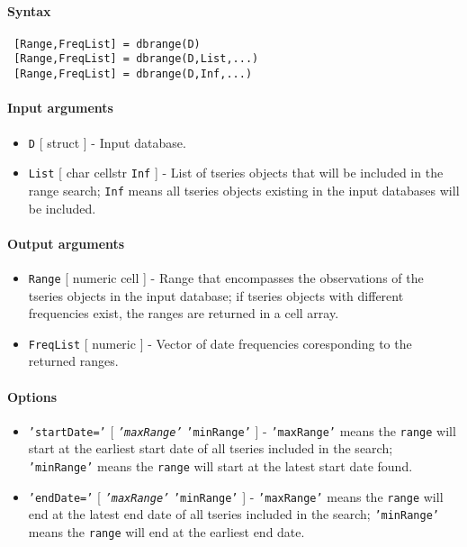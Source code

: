 


	\paragraph{Syntax}
 
 \begin{verbatim}
 [Range,FreqList] = dbrange(D)
 [Range,FreqList] = dbrange(D,List,...)
 [Range,FreqList] = dbrange(D,Inf,...)
 \end{verbatim}
 
 \paragraph{Input arguments}
 
 \begin{itemize}
 \item
   \texttt{D} {[} struct {]} - Input database.
 \item
   \texttt{List} {[} char \textbar{} cellstr \textbar{} \texttt{Inf} {]}
   - List of tseries objects that will be included in the range search;
   \texttt{Inf} means all tseries objects existing in the input databases
   will be included.
 \end{itemize}
 
 \paragraph{Output arguments}
 
 \begin{itemize}
 \item
   \texttt{Range} {[} numeric \textbar{} cell {]} - Range that
   encompasses the observations of the tseries objects in the input
   database; if tseries objects with different frequencies exist, the
   ranges are returned in a cell array.
 \item
   \texttt{FreqList} {[} numeric {]} - Vector of date frequencies
   coresponding to the returned ranges.
 \end{itemize}
 
 \paragraph{Options}
 
 \begin{itemize}
 \item
   \texttt{'startDate='} {[} \emph{\texttt{'maxRange'}} \textbar{}
   \texttt{'minRange'} {]} - \texttt{'maxRange'} means the \texttt{range}
   will start at the earliest start date of all tseries included in the
   search; \texttt{'minRange'} means the \texttt{range} will start at the
   latest start date found.
 \item
   \texttt{'endDate='} {[} \emph{\texttt{'maxRange'}} \textbar{}
   \texttt{'minRange'} {]} - \texttt{'maxRange'} means the \texttt{range}
   will end at the latest end date of all tseries included in the search;
   \texttt{'minRange'} means the \texttt{range} will end at the earliest
   end date.
 \end{itemize}
 
